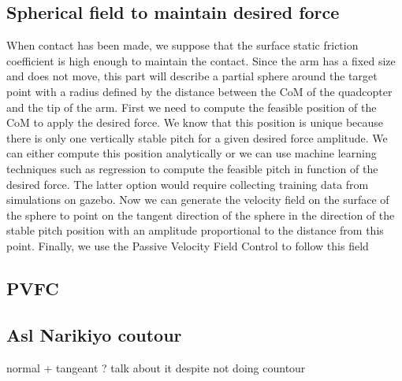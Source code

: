 \subsection{Spherical field to maintain desired force }
When contact has been made, we suppose that the surface static friction coefficient is high enough to maintain the contact.
Since the arm has a fixed size and does not move, this part will describe a partial sphere around the target point with a radius defined by the distance between the CoM of the quadcopter and the tip of the arm.
First we need to compute the feasible position of the CoM to apply the desired force. 
We know that this position is unique because there is only one vertically stable pitch for a given desired force amplitude. We can either compute this position analytically or we can use machine learning techniques such as regression to compute the feasible pitch in function of the desired force. The latter option would require collecting training data from simulations on gazebo. 
Now we can generate the velocity field on the surface of the sphere to point on the tangent direction of the sphere in the direction of the stable pitch position with an amplitude proportional to the distance from this point. Finally, we use the Passive Velocity Field Control to follow this field


\subsection{PVFC}

\subsection{Asl Narikiyo coutour}
normal + tangeant ? talk about it despite not doing countour

